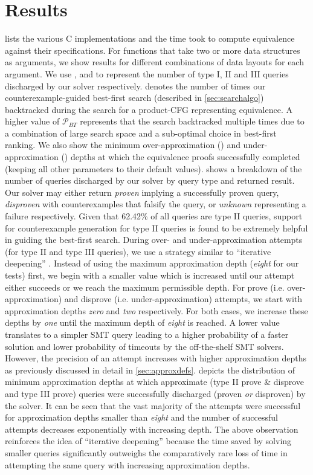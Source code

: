 \section{Results}
\label{sec:results}
 lists the various C implementations and the time \toolName{} took
to compute equivalence against their specifications.
For functions that take two or more data structures as arguments, we show
results for different combinations of data layouts for each argument.
We use ,  and  to represent the number of type I, II and III
queries discharged by our solver respectively.
\btcount{} denotes the number of times our counterexample-guided best-first search (described in \cref{sec:searchalgo}) backtracked
during the search for a product-CFG representing equivalence.
A higher value of $\mathcal{P}_{BT}$ represents that the search backtracked multiple times due to a combination of large search space
and a sub-optimal choice in best-first ranking.
We also show the minimum over-approximation () and under-approximation () depths
at which the equivalence proofs successfully completed (keeping all other parameters to their
default values).
 shows a breakdown of the number of queries discharged by our solver by query type and returned result.
Our solver may either return {\em proven} implying a successfully proven query, {\em disproven} with counterexamples
that falsify the query, or {\em unknown} representing a failure respectively.
Given that 62.42\% of all queries are type II queries, support for counterexample generation for type II queries is found to be
extremely helpful in guiding the best-first search.
During over- and under-approximation attempts (for type II and type III queries), we use a strategy similar to ``iterative deepening'' \cite{iterativedeepening}.
Instead of using the maximum approximation depth ({\em eight} for our tests) first, we begin with a smaller value which is increased until
our attempt either succeeds or we reach the maximum permissible depth.
For prove (i.e. over-approximation) and disprove (i.e. under-approximation) attempts, we start with approximation depths {\em zero} and {\em two} respectively.
For both cases, we increase these depths by {\em one} until the maximum depth of {\em eight} is reached.
A lower value translates to a simpler SMT query leading to a higher probability of a faster solution and lower probability of timeouts by the off-the-shelf SMT solvers.
However, the precision of an attempt increases with higher approximation depths as previously discussed in detail in \cref{sec:approxdefs}.
 depicts the distribution of minimum approximation depths at which approximate (type II prove \& disprove and type III prove) queries
were successfully discharged (proven {\em or} disproven) by the solver.
It can be seen that the vast majority of the attempts were successful for approximation depths smaller than {\em eight}
and the number of successful attempts decreases exponentially with increasing depth.
The above observation reinforces the idea of ``iterative deepening'' because the time saved by solving smaller queries significantly
outweighs the comparatively rare loss of time in attempting the same query with increasing approximation depths.

